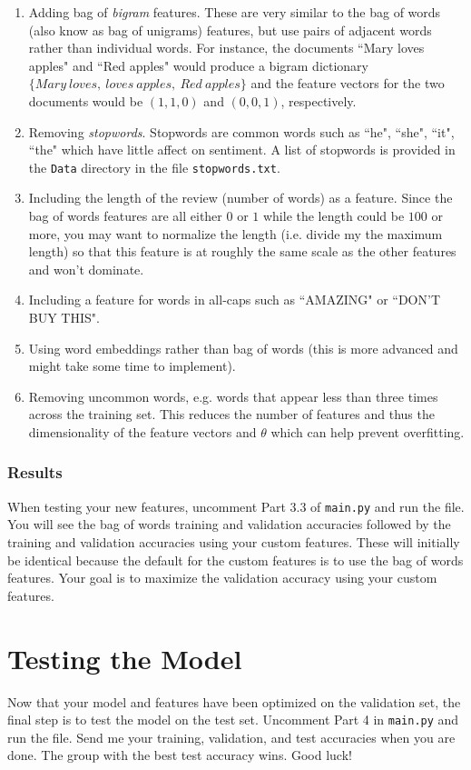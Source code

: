 \documentclass{article}
\begin{document}
\begin{enumerate}
\item Adding bag of \textit{bigram} features. These are very similar to the bag of words (also know as bag of unigrams) features, but use pairs of adjacent words rather than individual words. For instance, the documents ``Mary loves apples" and ``Red apples" would produce a bigram dictionary $\{Mary\ loves,\ loves\ apples,\ Red\ apples\}$ and the feature vectors for the two documents would be $(1, 1, 0)$ and $(0, 0, 1)$, respectively.

\item Removing \textit{stopwords}. Stopwords are common words such as ``he", ``she", ``it", ``the" which have little affect on sentiment. A list of stopwords is provided in the \texttt{Data} directory in the file \texttt{stopwords.txt}.

\item Including the length of the review (number of words) as a feature. Since the bag of words features are all either $0$ or $1$ while the length could be $100$ or more, you may want to normalize the length (i.e. divide my the maximum length) so that this feature is at roughly the same scale as the other features and won't dominate.

\item Including a feature for words in all-caps such as ``AMAZING" or ``DON'T BUY THIS".

\item Using word embeddings rather than bag of words (this is more advanced and might take some time to implement).

\item Removing uncommon words, e.g. words that appear less than three times across the training set. This reduces the number of features and thus the dimensionality of the feature vectors and $\theta$ which can help prevent overfitting.
\end{enumerate}

\subsubsection{Results}

When testing your new features, uncomment Part 3.3 of \texttt{main.py} and run the file. You will see the bag of words training and validation accuracies followed by the training and validation accuracies using your custom features. These will initially be identical because the default for the custom features is to use the bag of words features. Your goal is to maximize the validation accuracy using your custom features.

\section{Testing the Model}

Now that your model and features have been optimized on the validation set, the final step is to test the model on the test set. Uncomment Part 4 in \texttt{main.py} and run the file. Send me your training, validation, and test accuracies when you are done. The group with the best test accuracy wins. Good luck!
\end{document}
